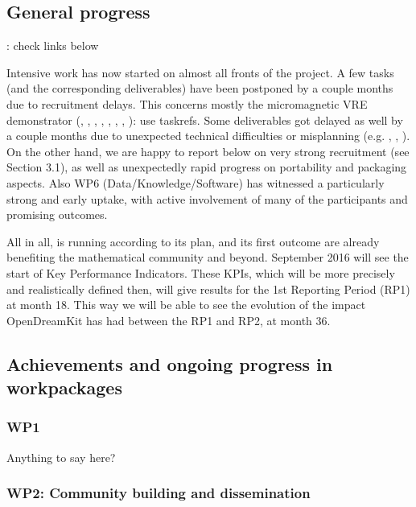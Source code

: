 \documentclass{deliverablereport}
\newcommand{\TODO}[1]{{\color{red}{TODO}: #1}}
\begin{document}
\subsection{General progress}

\TODO{check links below}

Intensive work has now started on almost all fronts of the project. A
few tasks (and the corresponding deliverables) have been postponed by
a couple months due to recruitment delays. This concerns mostly the
micromagnetic VRE demonstrator (, , , , , , , )\TODO{use taskrefs}. Some deliverables got delayed as well
by a couple months due to unexpected technical difficulties or
misplanning (e.g. ,
, ). On
the other hand, we are happy to report below on very strong
recruitment (see Section 3.1), as well as unexpectedly rapid
progress on portability and packaging aspects. Also WP6
(Data/Knowledge/Software) has witnessed a particularly strong and
early uptake, with active involvement of many of the participants and
promising outcomes.

All in all, \ODK is running according to its plan, and its first
outcome are already benefiting the mathematical community and beyond. September 2016 will see the start of Key Performance Indicators. These KPIs, which will be more precisely and realistically defined then, will give results for the 1st Reporting Period (RP1) at month 18. This way we will be able to see the evolution of the impact OpenDreamKit has had between the RP1 and RP2, at month 36.


\subsection{Achievements and ongoing progress in workpackages}

\subsubsection{WP1}

Anything to say here?

\subsubsection{WP2: Community building and dissemination}
\end{document}
